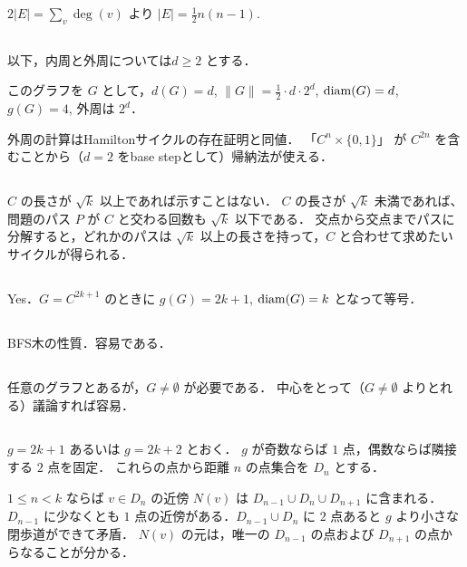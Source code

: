 \subsection{}
$2|E| = \sum_v \deg(v)$ より $|E| = \frac12 n(n-1)$. 

\subsection{}
以下，内周と外周については$d\geq 2$ とする．

このグラフを $G$ として，$d(G) = d$, $\|G\| = \frac{1}{2}\cdot d\cdot 2^d$, $\operatorname{diam}(G) = d$, $g(G) = 4$, 外周は $2^d$．

外周の計算はHamiltonサイクルの存在証明と同値．
「$C^n \times \{0,1\}$」 が $C^{2n}$ を含むことから（$d=2$ をbase stepとして）帰納法が使える．

\subsection{}
$C$ の長さが $\sqrt{k}$ 以上であれば示すことはない．
$C$ の長さが $\sqrt{k}$ 未満であれば、問題のパス $P$ が $C$ と交わる回数も $\sqrt{k}$ 以下である．
交点から交点までパスに分解すると，どれかのパスは $\sqrt{k}$ 以上の長さを持って，$C$ と合わせて求めたいサイクルが得られる．


\subsection{}
Yes．$G = C^{2k+1}$ のときに $g(G) = 2k+1$, $\operatorname{diam}(G) = k$ となって等号．

\subsection{}
BFS木の性質．容易である．

\subsection{}
任意のグラフとあるが，$G\neq \emptyset$ が必要である．
中心をとって（$G\neq \emptyset$ よりとれる）議論すれば容易．

\subsection{}
$g = 2k+1$ あるいは $g = 2k + 2$ とおく．
$g$ が奇数ならば $1$ 点，偶数ならば隣接する $2$ 点を固定．
これらの点から距離 $n$ の点集合を $D_n$ とする．

$1\leq n < k$ ならば $v\in D_n$ の近傍 $N(v)$ は $D_{n-1}\cup D_n \cup D_{n+1}$ に含まれる．
$D_{n-1}$ に少なくとも $1$ 点の近傍がある．$D_{n-1}\cup D_n$ に $2$ 点あると $g$ より小さな閉歩道ができて矛盾．
$N(v)$ の元は，唯一の $D_{n-1}$ の点および $D_{n+1}$ の点からなることが分かる．

